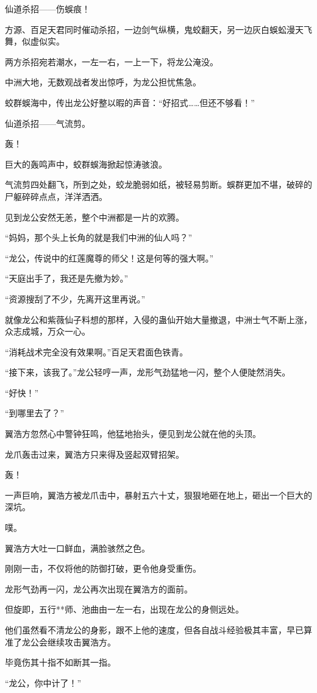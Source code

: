 \begin{this_body}
仙道杀招——伤蜈痕！

方源、百足天君同时催动杀招，一边剑气纵横，鬼蛟翻天，另一边灰白蜈蚣漫天飞舞，似虚似实。

两方杀招宛若潮水，一左一右，一上一下，将龙公淹没。

中洲大地，无数观战者发出惊呼，为龙公担忧焦急。

蛟群蜈海中，传出龙公好整以暇的声音：“好招式……但还不够看！”

仙道杀招——气流剪。

轰！

巨大的轰鸣声中，蛟群蜈海掀起惊涛骇浪。

气流剪四处翻飞，所到之处，蛟龙脆弱如纸，被轻易剪断。蜈群更加不堪，破碎的尸躯碎碎点点，洋洋洒洒。

见到龙公安然无恙，整个中洲都是一片的欢腾。

“妈妈，那个头上长角的就是我们中洲的仙人吗？”

“龙公，传说中的红莲魔尊的师父！这是何等的强大啊。”

“天庭出手了，我还是先撤为妙。”

“资源搜刮了不少，先离开这里再说。”

就像龙公和紫薇仙子料想的那样，入侵的蛊仙开始大量撤退，中洲士气不断上涨，众志成城，万众一心。

“消耗战术完全没有效果啊。”百足天君面色铁青。

“接下来，该我了。”龙公轻哼一声，龙形气劲猛地一闪，整个人便陡然消失。

“好快！”

“到哪里去了？”

翼浩方忽然心中警钟狂鸣，他猛地抬头，便见到龙公就在他的头顶。

龙爪轰击过来，翼浩方只来得及竖起双臂招架。

轰！

一声巨响，翼浩方被龙爪击中，暴射五六十丈，狠狠地砸在地上，砸出一个巨大的深坑。

噗。

翼浩方大吐一口鲜血，满脸骇然之色。

刚刚一击，不仅将他的防御打破，更令他身受重伤。

龙形气劲再一闪，龙公再次出现在翼浩方的面前。

但旋即，五行**师、池曲由一左一右，出现在龙公的身侧远处。

他们虽然看不清龙公的身影，跟不上他的速度，但各自战斗经验极其丰富，早已算准了龙公会继续攻击翼浩方。

毕竟伤其十指不如断其一指。

“龙公，你中计了！”


\end{this_body}
